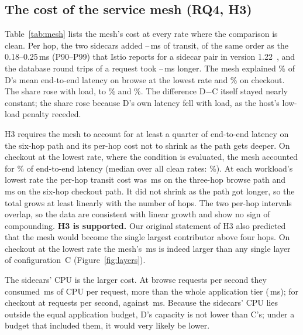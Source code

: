 \subsection{The cost of the service mesh (RQ4, H3)}
\label{sec:res-mesh}

Table~\ref{tab:mesh} lists the mesh's cost at every rate where the comparison is clean. Per hop, the two
sidecars added --\,ms of transit, of the same order as
the 0.18--0.25\,ms (P90--P99) that Istio reports for a sidecar pair in version 1.22~\cite{Istio122Perf}, and the database
round trips of a request took --\,ms longer. The mesh explained
\% of D's mean end-to-end latency on browse at the lowest rate and
\% on checkout. The share rose with load, to \% and
\%. The difference D$-$C itself stayed nearly constant; the share rose because D's own
latency fell with load, as the host's low-load penalty receded.

H3 requires the mesh to account for at least a quarter of end-to-end latency on the six-hop path and its per-hop
cost not to shrink as the path gets deeper. On checkout at the lowest rate, where the condition is evaluated, the
mesh accounted for \% of end-to-end latency (median over all clean rates:
\%). At each workload's lowest rate the per-hop transit cost was
\,ms on the three-hop browse path and \,ms on the six-hop
checkout path. It did not shrink as the path got longer, so the total grows at least linearly with the number of
hops. The two
per-hop intervals overlap, so the data are consistent with linear growth and show no sign of compounding. \textbf{H3 is supported.} Our original
statement of H3 also predicted that the mesh would become the single largest contributor above four hops. On
checkout at the lowest rate the mesh's \,ms is indeed larger than any single layer of
configuration~C (Figure~\ref{fig:layers}).

The sidecars' CPU is the larger cost. At  browse requests per second they consumed
\,ms of CPU per request, more than the whole application tier
(\,ms); for checkout at  requests per second,
 against \,ms. Because the sidecars' CPU lies outside the
equal application budget, D's capacity is not lower than C's; under a budget that included them, it would very
likely be lower.
